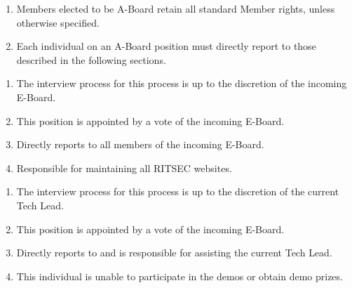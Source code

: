 

\begin{enumerate}
  \item Members elected to be A-Board retain all standard Member rights, unless otherwise specified. 
  \item Each individual on an A-Board position must directly report to those described in the following sections. 
\end{enumerate}


\begin{enumerate}
  \item The interview process for this process is up to the discretion of the incoming E-Board. 
  \item This position is appointed by a vote of the incoming E-Board.
  \item Directly reports to all members of the incoming E-Board. 
  \item Responsible for maintaining all RITSEC websites.
\end{enumerate}


\begin{enumerate}
  \item The interview process for this process is up to the discretion of the current Tech Lead.
  \item This position is appointed by a vote of the incoming E-Board.
  \item Directly reports to and is responsible for assisting the current Tech Lead.
  \item This individual is unable to participate in the demos or obtain demo prizes.
\end{enumerate}